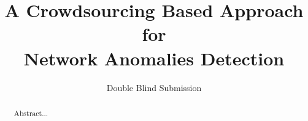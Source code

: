 \documentclass{sig-alternate}
\begin{document}
%

\title{A Crowdsourcing Based Approach for\\
Network Anomalies Detection}


\author{
	\alignauthor
	Double Blind Submission
%
}

\maketitle

\begin{abstract}
Abstract...
\end{abstract}


\end{document}
